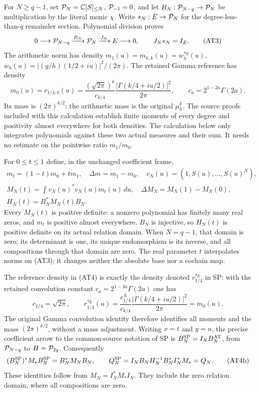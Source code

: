 For $N\ge q-1$, set $\mathcal P_N=\mathbb C[S]_{\le N}$,
$\mathcal P_{-1}=0$, and let
$B_N:\mathcal P_{N-q}\to\mathcal P_N$ be multiplication by the literal monic
$\chi$. Write $s_N:E\to\mathcal P_N$ for the degree-less-than-$q$
remainder section. Polynomial division proves
\[
 0\longrightarrow\mathcal P_{N-q}\xrightarrow{B_N}\mathcal P_N
       \xrightarrow{J_N}E\longrightarrow0,
 \qquad J_Ns_N=I_E.                         \tag{AT3}
\]
The arithmetic norm has density
$m_1(u)=m_{h,k}(u)=w_h^{*k}(u)$,
$w_h(u)=|(g/h)(1/2+iu)|^2/(2\pi)$.
The retained Gamma reference has density
\[
 m_0(u)=r_{1/4,k}(u)
 =\frac{(\sqrt{2\pi})^k}{c_{k/4}}
       \frac{|\Gamma(k/4+iu/2)|^2}{2\pi},
 \qquad c_a=2^{1-2a}\Gamma(2a).              \tag{AT4}
\]
Its mass is $(2\pi)^{k/2}$; the arithmetic mass is the original
$\mu_h^k$. The source proofs included with this calculation establish
finite moments of every degree and positivity almost everywhere for
both densities. The calculation below only integrates polynomials
against these two actual measures and their sum. It needs no estimate
on the pointwise ratio $m_1/m_0$.

For $0\le t\le1$ define, in the unchanged coefficient frame,
\[
 \begin{gathered}
 m_t=(1-t)m_0+tm_1,\quad \Delta m=m_1-m_0,
 \quad v_N(u)=(1,S(u),\ldots,S(u)^N),\\
 M_N(t)=\int v_N(u)^*v_N(u)m_t(u)\,du,
 \quad \Delta M_N=M_N(1)-M_N(0),\\
 H_N(t)=B_N^*M_N(t)B_N.                     \end{gathered}
 \tag{AT5}
\]
Every $M_N(t)$ is positive definite: a nonzero polynomial has finitely
many real zeros, and $m_t$ is positive almost everywhere. $B_N$ is
injective, so $H_N(t)$ is positive definite on its actual relation
domain. When $N=q-1$, that domain is zero; its determinant is one,
its unique endomorphism is its inverse, and all compositions through
that domain are zero. The real parameter $t$ interpolates norms on
(AT3); it changes neither the absolute base nor a cochain map.


The reference density in (AT4) is exactly the density denoted
$r_{1/4}^{*k}$ in SP: with the retained convolution constant
$c_a=2^{1-2a}\Gamma(2a)$ one has
\[
 c_{1/4}=\sqrt{2\pi},\qquad
 r_{1/4}^{*k}(u)=\frac{c_{1/4}^{\,k}}{c_{k/4}}
       \frac{|\Gamma(k/4+iu/2)|^2}{2\pi}=m_0(u).
 \tag{AT4a}
\]
The original Gamma convolution identity therefore identifies all
moments and the mass $(2\pi)^{k/2}$, without a mass adjustment.
Writing $x=t$ and $y=u$, the precise coefficient arrow to the
common-source notation of SP is
$B_N^{\rm SP}=I_NB_N^{\rm AT}$, from $\mathcal P_{N-q}$ to $H=\mathcal P_{2q}$.
Consequently
\[
 (B_N^{\rm SP})^*M_*B_N^{\rm SP}=B_N^*M_NB_N,\qquad
 Q_N^{\rm SP}=I_NB_NH_N^{-1}B_N^*I_N^*M_*=Q_N.
 \tag{AT4b}
\]
These identities follow from $M_N=I_N^*M_*I_N$. They include the
zero relation domain, where all compositions are zero.

